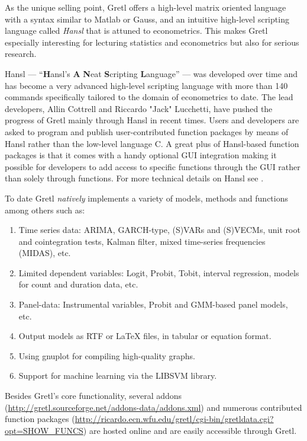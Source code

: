 \documentclass[11pt]{article}
\begin{document}
As the unique selling point, Gretl offers a high-level matrix oriented language with a syntax similar to Matlab or Gauss, and an intuitive high-level scripting language called \textit{Hansl} that is attuned to econometrics. This makes Gretl especially interesting for lecturing statistics and econometrics but also for serious research.

Hansl --- “\textbf{H}ansl’s \textbf{A} \textbf{N}eat \textbf{S}cripting \textbf{L}anguage” --- was developed over time and has become a very advanced high-level scripting language with more than 140 commands specifically tailored to the domain of econometrics to date. 
The lead developers, Allin Cottrell and Riccardo "Jack" Lucchetti, have pushed the progress of Gretl mainly through Hansl in recent times. Users and developers are asked to program and publish user-contributed function packages by means of Hansl rather than the low-level language C. A great plus of Hansl-based function packages is that it comes with a handy optional GUI integration making it possible for developers to add access to specific functions through the GUI rather than solely through functions. %
For more technical details on Hansl see \citet{Cottrell2017}.


To date Gretl \textit{natively} implements a variety of models, methods and functions among others such as: 
\begin{enumerate}
	\item Time series data: ARIMA, GARCH-type, (S)VARs and (S)VECMs, unit root and cointegration tests, Kalman filter, mixed time-series frequencies (MIDAS), etc.
	\item Limited dependent variables: Logit, Probit, Tobit, interval regression, models for count and duration data, etc.
	\item Panel-data: Instrumental variables, Probit and
	GMM-based panel models, etc.
	\item Output models as RTF or LaTeX files, in tabular or equation format.
	\item Using gnuplot for compiling high-quality graphs.
	\item Support for machine learning via the LIBSVM library.
\end{enumerate}
Besides Gretl's core functionality, several addons \\ (\url{http://gretl.sourceforge.net/addons-data/addons.xml}) and numerous contributed function packages (\url{http://ricardo.ecn.wfu.edu/gretl/cgi-bin/gretldata.cgi?opt=SHOW_FUNCS}) are hosted online and are easily accessible through Gretl.
\end{document}
